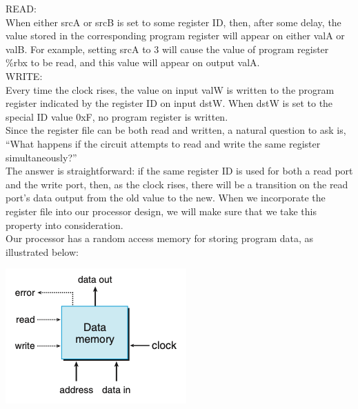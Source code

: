 \documentclass[11pt]{article}
\begin{document}
READ:\\
When either srcA or srcB is set to some register ID, then, after some delay, the value stored in the corresponding program register will appear on either valA or valB. For example, setting srcA to 3 will cause the value of program register \%rbx to be read, and this value will appear on output valA.\\

WRITE:\\
Every time the clock rises, the value on input valW is written to the program register indicated by the register ID on input dstW. When dstW is set to the special ID value 0xF, no program register is written.\\

Since the register file can be both read and written, a natural question to ask is, “What happens if the circuit attempts to read and write the same register simultaneously?”\\
The answer is straightforward: if the same register ID is used for both a read port and the write port, then, as the clock rises, there will be a transition on the read port’s data output from the old value to the new. When we incorporate the register file into our processor design, we will make sure that we take this property into consideration.\\

Our processor has a random access memory for storing program data, as illustrated below:\\

\begin{center}
\includegraphics[width=.9\linewidth]{pics/ram.png}
\end{center}
\end{document}
